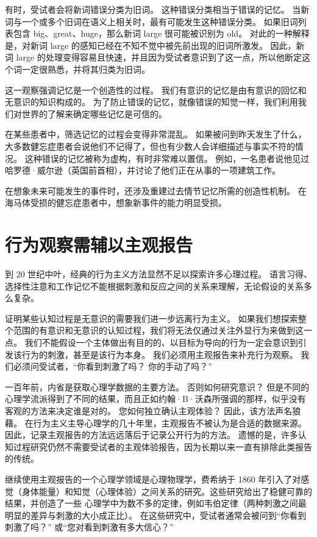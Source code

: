 有时，受试者会将新词错误分类为旧词。 这种错误分类相当于错误的记忆。 当新词与一个或多个旧词在语义上相关时，最有可能发生这种错误分类。 如果旧词列表包含 big、great、huge，那么新词 large 很可能被识别为 old。 对此的一种解释是，对新词 large 的感知已经在不知不觉中被先前出现的旧词所激发。 因此，新词 large 的处理变得容易且快速，并且因为受试者意识到了这一点，所以他断定这个词一定很熟悉，并将其归类为旧词。

这一观察强调记忆是一个创造性的过程。 我们有意识的记忆是由有意识的回忆和无意识的知识构成的。 为了防止错误的记忆，就像错误的知觉一样，我们利用我们对世界的了解来确定哪些记忆是可信的。

在某些患者中，筛选记忆的过程会变得非常混乱。 如果被问到昨天发生了什么，大多数健忘症患者会说他们不记得了，但也有少数人会详细描述与事实不符的情况。 这种错误的记忆被称为虚构，有时非常难以置信。 例如，一名患者说他见过哈罗德·威尔逊（英国前首相），并讨论了他们正在从事的一项建筑工作。

在想象未来可能发生的事件时，还涉及重建过去情节记忆所需的创造性机制。 在海马体受损的健忘症患者中，想象新事件的能力明显受损。


\section{行为观察需辅以主观报告}
到 20 世纪中叶，经典的行为主义方法显然不足以探索许多心理过程。 语言习得、选择性注意和工作记忆不能根据刺激和反应之间的关系来理解，无论假设的关系多么复杂。

证明某些认知过程是无意识的需要我们进一步远离行为主义。 如果我们想探索整个范围的有意识和无意识的认知过程，我们将无法仅通过关注外显行为来做到这一点。 我们不能假设一个主体做出有目的的、以目标为导向的行为一定会意识到引发该行为的刺激，甚至是该行为本身。 我们必须用主观报告来补充行为观察。 我们必须问受试者，“你看到刺激了吗？ 你的手动了吗？”

一百年前，内省是获取心理学数据的主要方法。 否则如何研究意识？ 但是不同的心理学流派得到了不同的结果，而且正如约翰·B·沃森所强调的那样，似乎没有客观的方法来决定谁是对的。 您如何独立确认主观体验？ 因此，该方法声名狼藉。 在行为主义主导心理学的几十年里，主观报告不被认为是合适的数据来源。 因此，记录主观报告的方法远远落后于记录公开行为的方法。 遗憾的是，许多认知过程研究仍然不需要受试者的主观体验报告，因为长期以来一直有排除此类报告的传统。

继续使用主观报告的一个心理学领域是心理物理学，费希纳于 1860 年引入了对感觉（身体能量）和知觉（心理体验）之间关系的研究。这些研究给出了稳健可靠的结果，并创造了一些 心理学中为数不多的定律，例如韦伯定律（两种刺激之间最明显的差异与刺激的大小成正比）。 在这些研究中，受试者通常会被问到“你看到刺激了吗？” 或“您对看到刺激有多大信心？”

